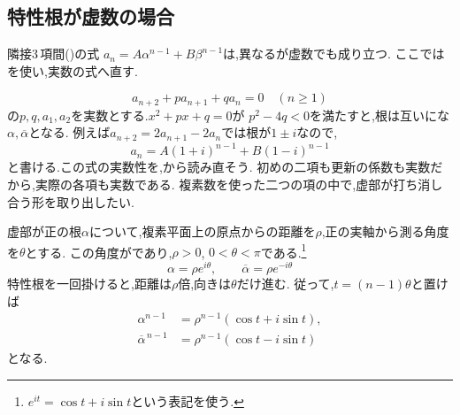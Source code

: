 \subsection{特性根が虚数の場合}\label{節：虚数解型隣接3項間漸化式}

  隣接3\,項間()の式
  $a_n=A\alpha^{n-1}+B\beta^{n-1}$は,異なるが虚数でも成り立つ.
  ここではを使い,実数の式へ直す.

  \[
    a_{n+2}+pa_{n+1}+qa_n=0\quad(n\ge1)
  \]
  の$p,q,a_1,a_2$を実数とする.$x^2+px+q=0$が
  $p^2-4q<0$を満たすと,根は互いにな$\alpha,\overline\alpha$となる.
  例えば$a_{n+2}=2a_{n+1}-2a_n$では根が$1\pm i$なので,
  \[
    a_n=A(1+i)^{n-1}+B(1-i)^{n-1}
  \]
  と書ける.この式の実数性を,から読み直そう.
  初めの二項も更新の係数も実数だから,実際の各項も実数である.
  複素数を使った二つの項の中で,虚部が打ち消し合う形を取り出したい.

  虚部が正の根$\alpha$について,複素平面上の原点からの距離を$\rho$,正の実軸から測る角度を$\theta$とする.
  この角度がであり,$\rho>0$, $0<\theta<\pi$である.\footnote{$e^{it}=\cos t+i\sin t$という表記を使う.}
  \[
    \alpha=\rho e^{i\theta},\qquad
    \overline\alpha=\rho e^{-i\theta}
  \]
  特性根を一回掛けると,距離は$\rho$倍,向きは$\theta$だけ進む.
  従って,$t=(n-1)\theta$と置けば
  \[
    \begin{aligned}
      \alpha^{n-1}&=\rho^{n-1}(\cos t+i\sin t),\\
      \overline\alpha^{\,n-1}&=\rho^{n-1}(\cos t-i\sin t)
    \end{aligned}
  \]
  となる.
  \BookFigComplexRoots

